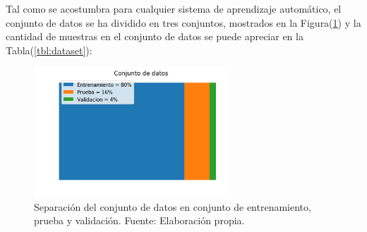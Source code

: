     Tal como se acostumbra para cualquier sistema de aprendizaje automático, el conjunto de datos se 
    ha dividido en tres conjuntos, mostrados en la Figura(\ref{fig:dataset1}) y la cantidad de muestras en el conjunto 
    de datos se puede apreciar en la Tabla(\ref{tbl:dataset}):
    
    \begin{table}[!h]
        \centering
        \caption[Cantidad de muestras en los conjuntos de datos.]{Cantidad de muestras en los conjuntos de datos. Fuente: Elaboración propia.}
        \label{tbl:dataset}
    \end{table}

    \begin{figure}[!h] 
        \centering
        \includegraphics[width=0.65\textwidth]{img/dataset1}
        \caption[Separación del conjunto de datos]{Separación del conjunto de datos en conjunto de entrenamiento, prueba y validación. Fuente: Elaboración propia. }
        \label{fig:dataset1}
    \end{figure}
    
